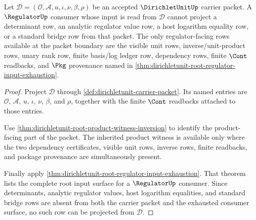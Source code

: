 \begin{theorem}
\label{thm:dirichletunit-regulator-row-exclusion}
Let $\mathcal{D}=(\mathcal{O},\mathcal{A},u,\iota,\nu,\beta,\rho)$ be an
accepted $\DirichletUnitUp$ carrier packet. A $\RegulatorUp$ consumer whose
input is read from $\mathcal{D}$ cannot project a determinant row, an analytic
regulator value row, a host logarithm equality row, or a standard bridge row
from that packet. The only regulator-facing rows available at the packet
boundary are the visible unit rows, inverse/unit-product rows, unary rank row,
finite basis/log ledger row, dependency rows, finite $\Cont$ readbacks, and
$\Pkg$ provenance named in
\autoref{thm:dirichletunit-root-regulator-input-exhaustion}.
\end{theorem}
\begin{proof}
Project $\mathcal{D}$ through
\autoref{def:dirichletunit-carrier-packet}. Its named entries are
$\mathcal{O}$, $\mathcal{A}$, $u$, $\iota$, $\nu$, $\beta$, and $\rho$, together
with the finite $\Cont$ readbacks attached to those entries.

Use \autoref{thm:dirichletunit-root-product-witness-inversion} to identify the
product-facing part of the packet. The inherited product witness is available
only where the two dependency certificates, visible unit rows, inverse rows,
finite readbacks, and package provenance are simultaneously present.

Finally apply
\autoref{thm:dirichletunit-root-regulator-input-exhaustion}. That theorem
lists the complete root input surface for a $\RegulatorUp$ consumer. Since
determinants, analytic regulator values, host logarithm equalities, and
standard bridge rows are absent from both the carrier packet and the exhausted
consumer surface, no such row can be projected from $\mathcal{D}$.
\end{proof}


